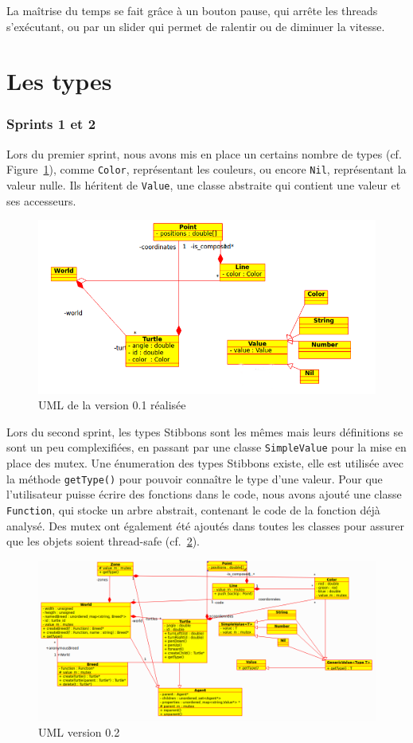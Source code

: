 La maîtrise du temps se fait grâce à un bouton pause, qui arrête les threads s'exécutant, ou par un slider qui permet de ralentir ou de diminuer la vitesse.

\section{Les types}
\subsubsection{Sprints 1 et 2}
Lors du premier sprint, nous avons mis en place un certains nombre de types (cf. Figure~\ref{v0.1R}), comme \verb|Color|, représentant les couleurs, ou encore \verb|Nil|, représentant la valeur nulle. Ils héritent de \verb|Value|, une classe abstraite qui contient une valeur et ses accesseurs.

\begin{figure}[h]
\centering
\includegraphics[scale=0.5]{doc/report/uml/v01reel.png}
\caption{\label{v0.1R} UML de la version 0.1 réalisée}
\end{figure}

Lors du second sprint, les types Stibbons sont les mêmes mais leurs définitions se sont un peu complexifiées, en passant par une classe \verb|SimpleValue| pour la mise en place des mutex. Une énumeration des types Stibbons existe, elle est utilisée avec la méthode \verb|getType()| pour pouvoir connaître le type d'une valeur.
Pour que l'utilisateur puisse écrire des fonctions dans le code, nous avons ajouté une classe \verb|Function|, qui stocke un arbre abstrait, contenant le code de la fonction déjà analysé.
Des mutex ont également été ajoutés dans toutes les classes pour assurer que les objets soient thread-safe (cf.~\ref{v0.2}).

\begin{figure}[h]
\centering
\includegraphics[scale=0.45]{doc/report/uml/v02.png}
\caption{\label{v0.2} UML version 0.2}
\end{figure}

